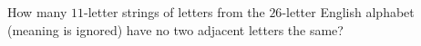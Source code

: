 How many $11$-letter strings of letters from the $26$-letter English alphabet (meaning is ignored) have no two adjacent letters the same?
